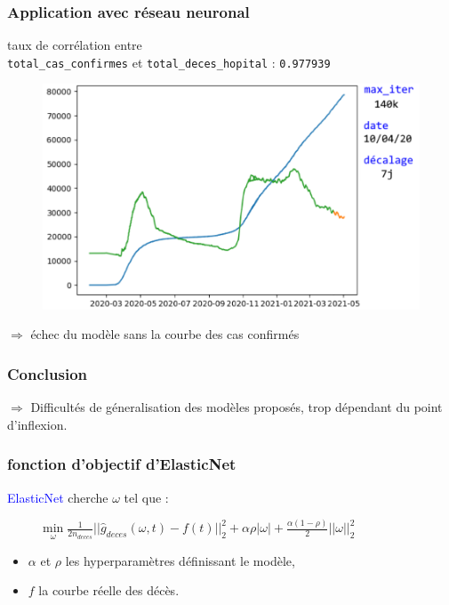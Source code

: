 \documentclass{beamer}[aspectratio = 43]
\begin{document}
\begin{frame}
	\frametitle{Application avec réseau neuronal}
	taux de corrélation entre\\ \texttt{total\_cas\_confirmes} et \texttt{total\_deces\_hopital} : \texttt{0.977939} 
	\begin{figure}
		\includegraphics[scale=0.4]{NN_up_}
	\end{figure}
	$\Rightarrow$ échec du modèle sans la courbe des cas confirmés
\end{frame}

\begin{frame}
	\frametitle{Conclusion}
$\Rightarrow$ Difficultés de géneralisation des modèles proposés, trop dépendant du point d'inflexion.
\end{frame}

\appendix

\begin{frame}
	\frametitle{fonction d'objectif d'ElasticNet}
	\textcolor{blue}{ElasticNet} cherche $\omega$ tel que :
	\begin{figure}[h]
		$\underset{\omega}{\mathrm{min}} \; \frac{1}{2n_{deces}}||\hat{g}_{deces} (\omega,t) - f(t)||^{2}_{2} + \alpha \rho |\omega| + \frac{\alpha (1-\rho)}{2}||\omega||^{2}_{2}$
		\\
	\end{figure}
	\begin{itemize}
		\item[]$\alpha$ et $\rho$ les hyperparamètres définissant le modèle,\\
		\item[]$f$ la courbe réelle des décès.
	\end{itemize}
\end{frame}
\end{document}

